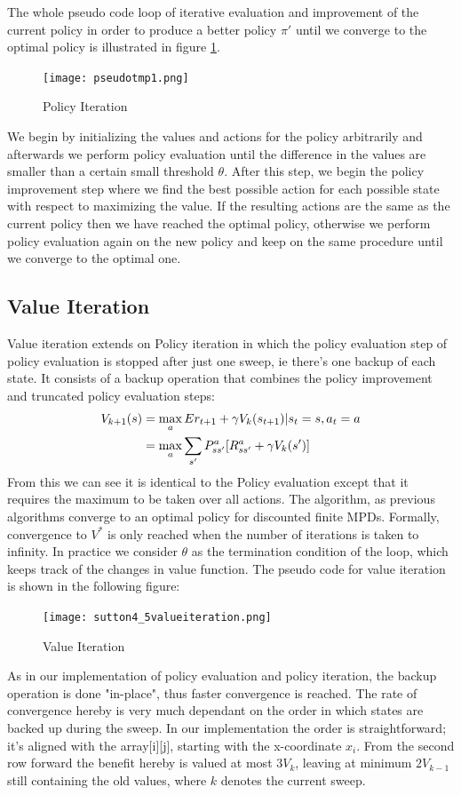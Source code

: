 \documentclass[paper=a4, fontsize=11pt]{scrartcl}
\numberwithin{equation}{section}		%
\numberwithin{figure}{section}			%
\numberwithin{table}{section}				%
\begin{document}
The whole pseudo code loop of iterative evaluation and improvement of the current policy in order to produce a better policy $\pi'$ until we converge to the optimal policy is illustrated in figure \ref{Policy Iteration}.

\begin{figure}[H] \centering
\texttt{[image: pseudotmp1.png]}
\caption{Policy Iteration ~\cite{suttonBarto}} \label{Policy Iteration}
\end{figure}

We begin by initializing the values and actions for the policy arbitrarily and afterwards we perform policy evaluation until the difference in the values are smaller than a certain small threshold $\theta$. After this step, we begin the policy improvement step where we find the best possible action for each possible state with respect to maximizing the value. If the resulting actions are the same as the current policy then we have reached the optimal policy, otherwise we perform policy evaluation again on the new policy and keep on the same procedure until we converge to the optimal one. 

\subsection{Value Iteration}
\label{VIter}
Value iteration extends on Policy iteration in which the policy evaluation step of policy evaluation is stopped after just one sweep, ie there's one backup of each state. It consists of a backup operation that combines the policy improvement and truncated policy evaluation steps:
\begin{align}
V_{k+1}(s) &= \max_{a} E{r_{t+1} + \gamma V_k(s_{t+1}) | s_t=s, a_t=a}\notag\\
& = \max_{a} \sum_{s'} P_{ss'}^a [R_{ss'}^a + \gamma V_k(s')]
\end{align}
From this we can see it is identical to the Policy evaluation except that it requires the maximum to be taken over all actions. The algorithm, as previous algorithms converge to an optimal policy for discounted finite MPDs. Formally, convergence to $V^{*}$ is only reached when the number of iterations is taken to infinity. In practice we consider $\theta$ as the termination condition of the loop, which keeps track of the changes in value function. The pseudo code for value iteration is shown in the following figure:
\begin{figure}[H] \centering
\texttt{[image: sutton4\_5valueiteration.png]}
\caption{Value Iteration ~\cite{suttonBarto}} \label{Value Iteration}
\end{figure}
As in our implementation of policy evaluation and policy iteration, the backup operation is done "in-place", thus faster convergence is reached. The rate of convergence hereby is very much dependant on the order in which states are backed up during the sweep. In our implementation the order is straightforward; it's aligned with the array[i][j], starting with the x-coordinate $x_i$. From the second row forward the benefit hereby is valued at most $3V_{k}$, leaving at minimum $2V_{k-1}$ still containing the old values, where $k$ denotes the current sweep.
\end{document}
